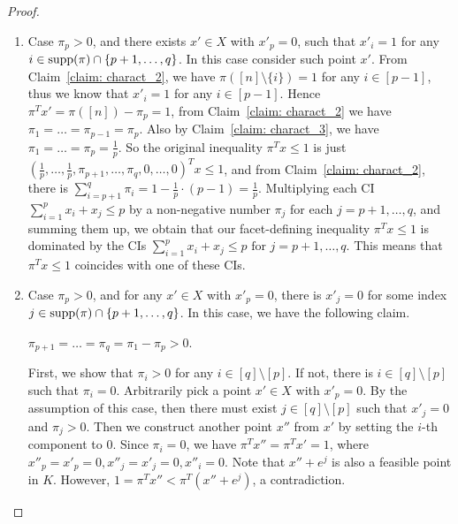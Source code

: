 \begin{appendices}
\begin{proof}
\begin{enumerate}
\item Case $\pi_p > 0$, and there exists $x' \in X$ with $x'_p = 0$, such that $x'_i = 1$ for any $i \in \operatorname{supp}(\pi) \cap \{p+1, \ldots, q\}$.
In this case consider such point $x'$.
From Claim~\ref{claim: charact_2}, we have $\pi([n] \setminus \{i\}) = 1$ for any $i \in [p-1]$, thus we know that $x'_i = 1$ for any $i \in [p-1]$. 
Hence $\pi^T x' = \pi([n]) - \pi_p = 1$, from Claim~\ref{claim: charact_2} we have $\pi_1 = \ldots = \pi_{p-1} = \pi_p$. 
Also by Claim~\ref{claim: charact_3}, we have $\pi_1 = \ldots = \pi_p = \frac{1}{p}$. 
So the original inequality $\pi^T x \leq 1$ is just $(\frac{1}{p}, \ldots, \frac{1}{p}, \pi_{p+1}, \ldots, \pi_q, 0, \ldots, 0)^T x \leq 1$, and from Claim~\ref{claim: charact_2}, there is $\sum_{i=p+1}^q \pi_i = 1-\frac{1}{p} \cdot (p-1) = \frac{1}{p}$. 
Multiplying each CI $\sum_{i=1}^p x_i + x_j \leq p$ by a  non-negative number $\pi_j$ for each $j = p+1, \ldots, q$, and summing them up, we obtain that our facet-defining inequality $\pi^T x \leq 1$ is dominated by the CIs $\sum_{i=1}^p x_i + x_j \leq p \text{ for } j=p+1, \ldots, q$.
This means that $\pi^T x \leq 1$ coincides with one of these CIs.

\item 
Case $\pi_p > 0$, and for any $x' \in X$ with $x'_p = 0$, there is $x'_j = 0$ for some index $j \in \operatorname{supp}(\pi) \cap \{p+1, \ldots, q\}$.
In this case, we have the following claim.
\begin{claim}
\label{claim: charact_4}
$\pi_{p+1} = \ldots = \pi_q = \pi_1 - \pi_p >0$.
\end{claim}
\begin{cpf}
First, we show that $\pi_i > 0$ for any $i \in [q] \setminus [p]$. If not, there is $i \in [q] \setminus [p]$ such that $\pi_i = 0$. 
Arbitrarily pick a point $x' \in X$ with $x'_p = 0$. By the assumption of this case, then there must exist $j \in [q] \setminus [p]$ such that $x'_j = 0$ and $\pi_j > 0$.
Then we construct another point $x''$ from $x'$ by setting the $i$-th component to 0. 
Since $\pi_i = 0$, we have $\pi^T x'' = \pi^T x' = 1$, where $x''_p = x'_p = 0, x''_j = x'_j = 0, x''_i = 0$. 
Note that $x'' + e^j$ is also a feasible point in $K$.
However, $1 =\pi^T x'' < \pi^T (x'' + e^j)$, a contradiction. 


\end{cpf}
\end{enumerate}
\end{proof}
\end{appendices}

